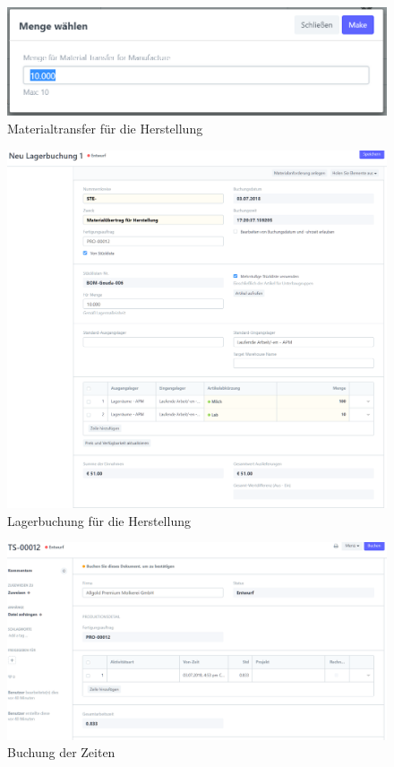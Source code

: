 \begin{figure}[H]
  \centering
  \includegraphics[width=\textwidth]{Bilder/Materialtransfer.PNG}
  \caption{Materialtransfer für die Herstellung}
  \label{fig:matTransfer}
\end{figure}
\begin{figure}[H]
  \centering
  \includegraphics[width=\textwidth]{Bilder/Lagerbuchung.PNG}
  \caption{Lagerbuchung für die Herstellung}
  \label{fig:lagBuchung}
\end{figure}
\begin{figure}[H]
  \centering
  \includegraphics[width=\textwidth]{Bilder/Timesheet.PNG}
  \caption{Buchung der Zeiten}
  \label{fig:timeSheet}
\end{figure}
